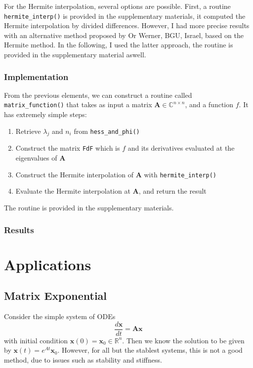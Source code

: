 \documentclass[12pt]{article}
\begin{document}
For the Hermite interpolation, several options are possible. First, a routine \texttt{hermite\_interp()} is provided in the supplementary materials, it computed the Hermite interpolation by divided differences. However, I had more precise results with an alternative method proposed by Or Werner, BGU, Israel, based on the Hermite method. In the following, I used the latter approach, the routine is provided in the supplementary material aswell.
\subsubsection{Implementation}
From the previous elements, we can construct a routine called \texttt{matrix\_function()} that takes as input a matrix $\mathbf{A}\in\mathbb{C}^{n\times n}$, and a function $f$. It has extremely simple steps:
\begin{enumerate}
    \item Retrieve $\lambda_j$ and $n_i$ from \texttt{hess\_and\_phi()}
    \item Construct the matrix \texttt{FdF} which is $f$ and its derivatives evaluated at the eigenvalues of $\mathbf{A}$
    \item Construct the Hermite interpolation of $\mathbf{A}$ with \texttt{hermite\_interp()}
    \item Evaluate the Hermite interpolation at $\mathbf{A}$, and return the result
\end{enumerate}
The routine is provided in the supplementary materials.
\subsubsection{Results}
\section{Applications}
\subsection{Matrix Exponential}\label{sec:matrixexp}
Consider the simple system of ODEs
\begin{equation}\label{eq:ode}
    \frac{d\mathbf{x}}{dt} = \mathbf{A}\mathbf{x}
\end{equation}
with initial condition $\mathbf{x}(0) = \mathbf{x}_0\in\mathbb{R}^n$. Then we know the solution to be given by $\mathbf{x}(t)=e^{At}\mathbf{x}_0$. However, for all but the stablest systems, this is not a good method, due to issues such as stability and stiffness.
\printbibliography
\end{document}
